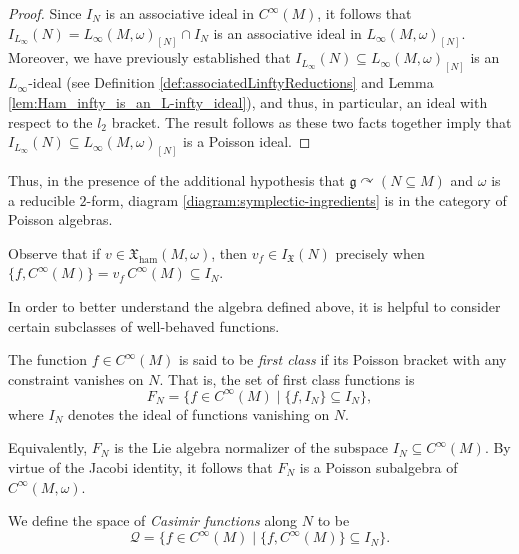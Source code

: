 \documentclass[10pt,a4paper]{amsart}
\numberwithin{equation}{section}
\newcommand{\g}{\mathfrak{g}}
\newcommand{\ham}{\text{ham}}
\newcommand{\X}{\mathfrak{X}}
\renewcommand{\subset}{\subseteq}
\begin{document}
\begin{proof}
	Since $I_N$ is an associative ideal in $C^\infty(M)$, it follows that $I_{L_\infty}(N) = L_\infty(M,\omega)_{[N]}\cap I_N$ is an associative ideal in $L_\infty(M,\omega)_{[N]}$. Moreover, we have previously established that $I_{L_\infty}(N)\subset L_\infty(M,\omega)_{[N]}$ is an $L_\infty$-ideal (see Definition \ref{def:associatedLinftyReductions} and Lemma \ref{lem:Ham_infty_is_an_L-infty_ideal}), and thus, in particular, an ideal with respect to the $l_2$ bracket. The result follows as these two facts together imply that $I_{L_\infty}(N)\subset L_\infty(M,\omega)_{[N]}$ is a Poisson ideal.
\end{proof}

Thus, in  the presence of the additional hypothesis that $\g\curvearrowright(N\subset M)$ and $\omega$ is a reducible $2$-form, diagram \eqref{diagram:symplectic-ingredients} is in the category of Poisson algebras.

\begin{Remark}\label{rem:comparingAlongN}
	Observe that if $v\in\X_\ham(M,\omega)$, then $v_f \in I_{\mathfrak{X}}(N)$ precisely when $\{f, C^\infty(M)\} = v_f\, C^\infty(M)\subset I_N$.
\end{Remark}

In order to better understand the algebra defined above, it is helpful to consider certain subclasses of well-behaved functions.
\begin{Definition}\label{def:IclassFunc}
	The function $f\in C^\infty(M)$ is said to be \emph{first class} if its Poisson bracket with any constraint vanishes on $N$. That is, the set of first class functions is
	\[
	 F_N =
		\lbrace
 		f \in C^\infty(M)
 		\mid
		\lbrace f, I_N \rbrace \subset I_N
		\rbrace,
	\]
	where $I_N$ denotes the ideal of functions vanishing on $N$.
\end{Definition}

Equivalently, $F_N$ is the Lie algebra normalizer of the subspace $I_N\subset C^\infty(M)$.
By virtue of the Jacobi identity, it follows that $F_N$ is a Poisson subalgebra of $C^\infty(M,\omega)$.


\begin{Definition}\label{def:Casimir_function}
	We define the space of \emph{Casimir functions} along $N$ to be
	\begin{equation}\label{eq:calQ}
	 \mathcal{Q}=
		\lbrace
			f \in C^\infty(M)
		 \mid
			\{ f, C^\infty(M)\} \subset I_N
		\rbrace	
		.
	\end{equation}
\end{Definition}
\end{document}
